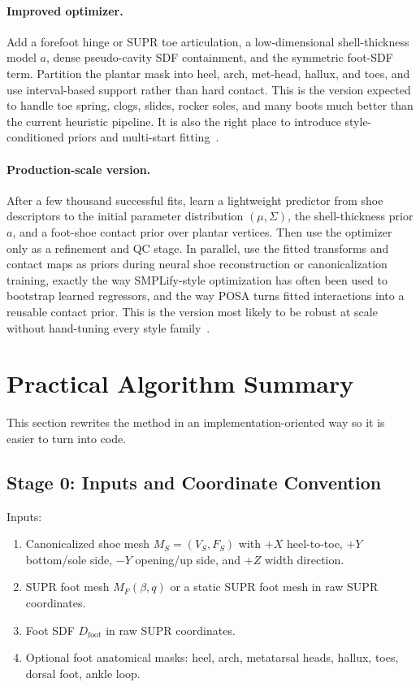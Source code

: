 \documentclass[11pt]{article}
\begin{document}
\paragraph{Improved optimizer.}
Add a forefoot hinge or SUPR toe articulation, a low-dimensional shell-thickness model $a$, dense pseudo-cavity SDF containment, and the symmetric foot-SDF term. Partition the plantar mask into heel, arch, met-head, hallux, and toes, and use interval-based support rather than hard contact. This is the version expected to handle toe spring, clogs, slides, rocker soles, and many boots much better than the current heuristic pipeline. It is also the right place to introduce style-conditioned priors and multi-start fitting~\cite{contactopt,toe-spring,supr-foot,sdf-collision}.

\paragraph{Production-scale version.}
After a few thousand successful fits, learn a lightweight predictor from shoe descriptors to the initial parameter distribution $(\mu,\Sigma)$, the shell-thickness prior $a$, and a foot-shoe contact prior over plantar vertices. Then use the optimizer only as a refinement and QC stage. In parallel, use the fitted transforms and contact maps as priors during neural shoe reconstruction or canonicalization training, exactly the way SMPLify-style optimization has often been used to bootstrap learned regressors, and the way POSA turns fitted interactions into a reusable contact prior. This is the version most likely to be robust at scale without hand-tuning every style family~\cite{smplify,posa}.

\section{Practical Algorithm Summary}

This section rewrites the method in an implementation-oriented way so it is easier to turn into code.

\subsection{Stage 0: Inputs and Coordinate Convention}

Inputs:

\begin{enumerate}
  \item Canonicalized shoe mesh $M_S=(V_S,F_S)$ with $+X$ heel-to-toe, $+Y$ bottom/sole side, $-Y$ opening/up side, and $+Z$ width direction.
  \item SUPR foot mesh $M_F(\beta,q)$ or a static SUPR foot mesh in raw SUPR coordinates.
  \item Foot SDF $D_{\mathrm{foot}}$ in raw SUPR coordinates.
  \item Optional foot anatomical masks: heel, arch, metatarsal heads, hallux, toes, dorsal foot, ankle loop.
\end{enumerate}
\end{document}
